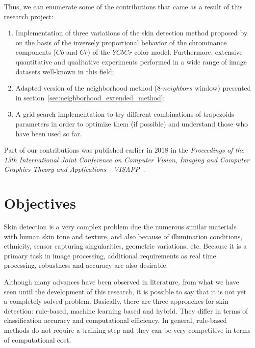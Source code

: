 Thus, we can enumerate some of the contributions that came as a result of this research project:
\begin{enumerate}
    \item Implementation of three variations of the skin detection method proposed by~\citet{brancati:17} on the basis of the inversely proportional behavior of the chrominance components ($Cb$ and $Cr$) of the $YCbCr$ color model. Furthermore, extensive quantitative and qualitative experiments performed in a wide range of image datasets well-known in this field;
    \item Adapted version of the neighborhood method (8-$neighbors$ window) presented in section~\ref{sec:neighborhood_extended_method};
    \item A grid search implementation to try different combinations of trapezoids parameters in order to optimize them (if possible) and understand those who have been used so far.
\end{enumerate}

Part of our contributions was published earlier in 2018 in the \emph{Proceedings of the 13th International Joint Conference on Computer Vision, Imaging and Computer Graphics Theory and Applications - VISAPP}~\citep{faria:18}.


\section{Objectives}
\label{sec:objectives}

Skin detection is a very complex problem due the numerous similar materials with human skin tone and texture, and also because of illumination conditions, ethnicity, sensor capturing singularities, geometric variations, etc. Because it is a primary task in image processing, additional requirements as real time processing, robustness and accuracy are also desirable.

Although many advances have been observed in literature, from what we have seen until the development of this research, it is possible to say that it is not yet a completely solved problem. Basically, there are three approaches for skin detection: rule-based, machine learning based and hybrid. They differ in terms of classification accuracy and computational efficiency. In general, rule-based methods do not require a training step and they can be very competitive in terms of computational cost.

